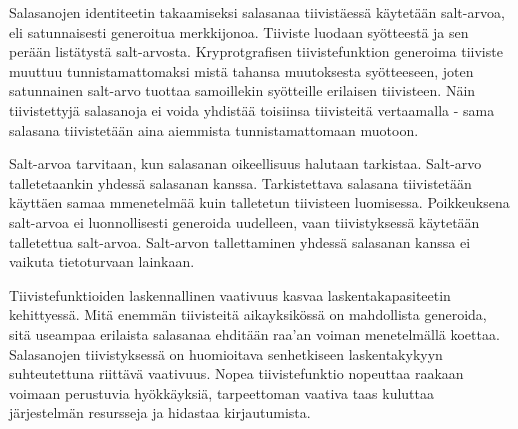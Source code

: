 \documentclass[12pt]{article}
\begin{document}
Salasanojen identiteetin takaamiseksi salasanaa tiivistäessä käytetään salt-arvoa, eli satunnaisesti generoitua merkkijonoa. Tiiviste luodaan syötteestä ja sen perään listätystä salt-arvosta. Kryprotgrafisen tiivistefunktion generoima tiiviste muuttuu tunnistamattomaksi mistä tahansa muutoksesta syötteeseen, joten satunnainen salt-arvo tuottaa samoillekin syötteille erilaisen tiivisteen. Näin tiivistettyjä salasanoja ei voida yhdistää toisiinsa tiivisteitä vertaamalla - sama salasana tiivistetään aina aiemmista tunnistamattomaan muotoon.

Salt-arvoa tarvitaan, kun salasanan oikeellisuus halutaan tarkistaa. Salt-arvo talletetaankin yhdessä salasanan kanssa. Tarkistettava salasana tiivistetään käyttäen samaa mmenetelmää kuin talletetun tiivisteen luomisessa. Poikkeuksena salt-arvoa ei luonnollisesti generoida uudelleen, vaan tiivistyksessä käytetään talletettua salt-arvoa. Salt-arvon tallettaminen yhdessä salasanan kanssa ei vaikuta tietoturvaan lainkaan. 

Tiivistefunktioiden laskennallinen vaativuus kasvaa laskentakapasiteetin kehittyessä. Mitä enemmän tiivisteitä aikayksikössä on mahdollista generoida,
sitä useampaa erilaista salasanaa ehditään raa'an voiman menetelmällä koettaa. Salasanojen tiivistyksessä on huomioitava senhetkiseen laskentakykyyn
suhteutettuna riittävä vaativuus. Nopea tiivistefunktio nopeuttaa raakaan voimaan perustuvia hyökkäyksiä, tarpeettoman vaativa taas kuluttaa järjestelmän resursseja ja hidastaa kirjautumista.
\end{document}
